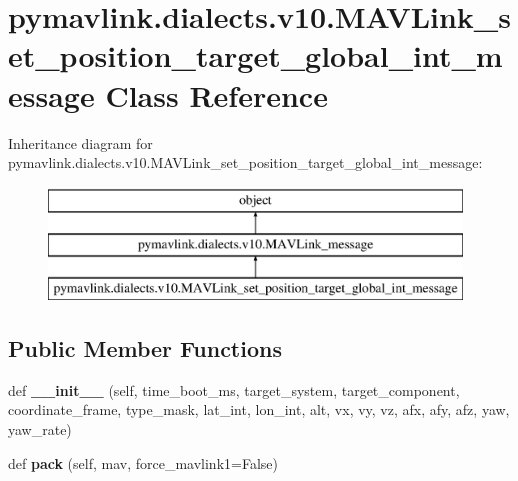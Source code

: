 \hypertarget{classpymavlink_1_1dialects_1_1v10_1_1MAVLink__set__position__target__global__int__message}{}\section{pymavlink.\+dialects.\+v10.\+M\+A\+V\+Link\+\_\+set\+\_\+position\+\_\+target\+\_\+global\+\_\+int\+\_\+message Class Reference}
\label{classpymavlink_1_1dialects_1_1v10_1_1MAVLink__set__position__target__global__int__message}
Inheritance diagram for pymavlink.\+dialects.\+v10.\+M\+A\+V\+Link\+\_\+set\+\_\+position\+\_\+target\+\_\+global\+\_\+int\+\_\+message\+:\begin{figure}[H]
\begin{center}
\leavevmode
\includegraphics[height=3.000000cm]{classpymavlink_1_1dialects_1_1v10_1_1MAVLink__set__position__target__global__int__message}
\end{center}
\end{figure}
\subsection*{Public Member Functions}
\begin{DoxyCompactItemize}
\item 
\mbox{\label{classpymavlink_1_1dialects_1_1v10_1_1MAVLink__set__position__target__global__int__message_a74bb7b17be1883e286a683d959fdd699}} 
def {\bfseries \+\_\+\+\_\+init\+\_\+\+\_\+} (self, time\+\_\+boot\+\_\+ms, target\+\_\+system, target\+\_\+component, coordinate\+\_\+frame, type\+\_\+mask, lat\+\_\+int, lon\+\_\+int, alt, vx, vy, vz, afx, afy, afz, yaw, yaw\+\_\+rate)
\item 
\mbox{\label{classpymavlink_1_1dialects_1_1v10_1_1MAVLink__set__position__target__global__int__message_a0ec84c7e88ad4699a9f3e6d7c7bc1649}} 
def {\bfseries pack} (self, mav, force\+\_\+mavlink1=False)
\end{DoxyCompactItemize}
